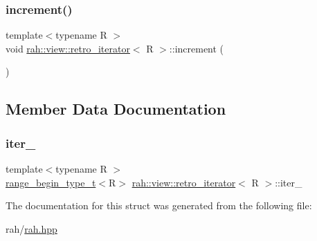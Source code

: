 \subsubsection{\texorpdfstring{increment()}{increment()}}
{\footnotesize\ttfamily template$<$typename R $>$ \\
void \mbox{\hyperlink{structrah_1_1view_1_1retro__iterator}{rah\+::view\+::retro\+\_\+iterator}}$<$ R $>$\+::increment (\begin{DoxyParamCaption}{ }\end{DoxyParamCaption})\hspace{0.3cm}{\ttfamily [inline]}}



\subsection{Member Data Documentation}
\mbox{\label{structrah_1_1view_1_1retro__iterator_a8c21328b89b978842df7951af4022393}} 
\subsubsection{\texorpdfstring{iter\_}{iter\_}}
{\footnotesize\ttfamily template$<$typename R $>$ \\
\mbox{\hyperlink{namespacerah_a28aff4eeddcece6be65ff0b956d32d4a}{range\+\_\+begin\+\_\+type\+\_\+t}}$<$R$>$ \mbox{\hyperlink{structrah_1_1view_1_1retro__iterator}{rah\+::view\+::retro\+\_\+iterator}}$<$ R $>$\+::iter\+\_\+}



The documentation for this struct was generated from the following file\+:\begin{DoxyCompactItemize}
\item 
rah/\mbox{\hyperlink{rah_8hpp}{rah.\+hpp}}\end{DoxyCompactItemize}
